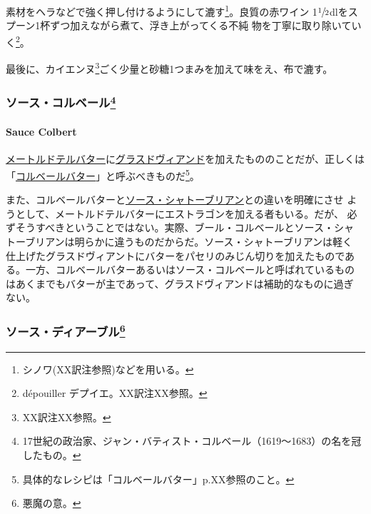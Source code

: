 素材をヘラなどで強く押し付けるようにして漉す\footnote{シノワ(XX訳注参照)などを用いる。}。良質の赤ワイン
1\(\sfrac{1}{2}\)dlをスプーン1杯ずつ加えながら煮て、浮き上がってくる不純
物を丁寧に取り除いていく\footnote{dépouiller デプイエ。XX訳注XX参照。}。

最後に、カイエンヌ\footnote{XX訳注XX参照。}ごく少量と砂糖1つまみを加えて味をえ、布で漉す。

\maeaki

\hypertarget{ux30bdux30fcux30b9ux30b3ux30ebux30d9ux30fcux30eb23}{%
\subsubsection[ソース・コルベール]{\texorpdfstring{ソース・コルベール\footnote{17世紀の政治家、ジャン・バティスト・コルベール（1619〜1683）の名を冠したもの。}}{ソース・コルベール}}\label{ux30bdux30fcux30b9ux30b3ux30ebux30d9ux30fcux30eb23}}

\hypertarget{sauce-colbert}{%
\paragraph{Sauce Colbert}\label{sauce-colbert}}


\href{}{メートルドテルバター}に\protect\hyperlink{glace-de-viande}{グラスドヴィアンド}を加えたもののことだが、正しくは「\href{}{コルベールバター}」と呼ぶべきものだ\footnote{具体的なレシピは「コルベールバター」p.XX参照のこと。}。

また、コルベールバターと\href{}{ソース・シャトーブリアン}との違いを明確にさせ
ようとして、メートルドテルバターにエストラゴンを加える者もいる。だが、
必ずそうすべきということではない。実際、ブール・コルベールとソース・シャ
トーブリアンは明らかに違うものだからだ。ソース・シャトーブリアンは軽く
仕上げたグラスドヴィアントにバターをパセリのみじん切りを加えたものであ
る。一方、コルベールバターあるいはソース・コルベールと呼ばれているもの
はあくまでもバターが主であって、グラスドヴィアンドは補助的なものに過ぎ
ない。

\maeaki

\hypertarget{ux30bdux30fcux30b9ux30c7ux30a3ux30a2ux30fcux30d6ux30eb25}{%
\subsubsection[ソース・ディアーブル]{\texorpdfstring{ソース・ディアーブル\footnote{悪魔の意。}}{ソース・ディアーブル}}\label{ux30bdux30fcux30b9ux30c7ux30a3ux30a2ux30fcux30d6ux30eb25}}

